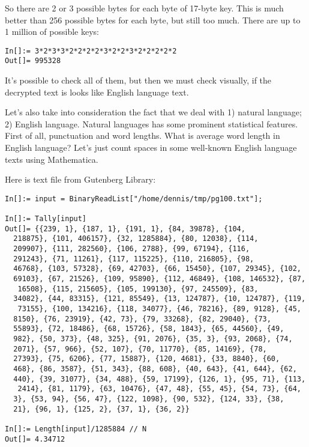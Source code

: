 So there are 2 or 3 possible bytes for each byte of 17-byte key.
This is much better than 256 possible bytes for each byte, but still too much.
There are up to 1 million of possible keys:

\begin{lstlisting}[caption=Mathematica,style=custommath]
In[]:= 3*2*3*3*2*2*2*2*3*2*2*3*2*2*2*2*2
Out[]= 995328
\end{lstlisting}

It's possible to check all of them, but then we must check visually, if the decrypted text is looks like English language text.

Let's also take into consideration the fact that we deal with 1) natural language; 2) English language.
Natural languages has some prominent statistical features.
First of all, punctuation and word lengths.
What is average word length in English language?
Let's just count spaces in some well-known English language texts using Mathematica.

Here is \href{http://www.gutenberg.org/cache/epub/100/pg100.txt}{} text file from Gutenberg Library:

\begin{lstlisting}[caption=Mathematica,style=custommath]
In[]:= input = BinaryReadList["/home/dennis/tmp/pg100.txt"];

In[]:= Tally[input]
Out[]= {{239, 1}, {187, 1}, {191, 1}, {84, 39878}, {104, 
  218875}, {101, 406157}, {32, 1285884}, {80, 12038}, {114, 
  209907}, {111, 282560}, {106, 2788}, {99, 67194}, {116, 
  291243}, {71, 11261}, {117, 115225}, {110, 216805}, {98, 
  46768}, {103, 57328}, {69, 42703}, {66, 15450}, {107, 29345}, {102, 
  69103}, {67, 21526}, {109, 95890}, {112, 46849}, {108, 146532}, {87,
   16508}, {115, 215605}, {105, 199130}, {97, 245509}, {83, 
  34082}, {44, 83315}, {121, 85549}, {13, 124787}, {10, 124787}, {119,
   73155}, {100, 134216}, {118, 34077}, {46, 78216}, {89, 9128}, {45, 
  8150}, {76, 23919}, {42, 73}, {79, 33268}, {82, 29040}, {73, 
  55893}, {72, 18486}, {68, 15726}, {58, 1843}, {65, 44560}, {49, 
  982}, {50, 373}, {48, 325}, {91, 2076}, {35, 3}, {93, 2068}, {74, 
  2071}, {57, 966}, {52, 107}, {70, 11770}, {85, 14169}, {78, 
  27393}, {75, 6206}, {77, 15887}, {120, 4681}, {33, 8840}, {60, 
  468}, {86, 3587}, {51, 343}, {88, 608}, {40, 643}, {41, 644}, {62, 
  440}, {39, 31077}, {34, 488}, {59, 17199}, {126, 1}, {95, 71}, {113,
   2414}, {81, 1179}, {63, 10476}, {47, 48}, {55, 45}, {54, 73}, {64, 
  3}, {53, 94}, {56, 47}, {122, 1098}, {90, 532}, {124, 33}, {38, 
  21}, {96, 1}, {125, 2}, {37, 1}, {36, 2}}

In[]:= Length[input]/1285884 // N
Out[]= 4.34712
\end{lstlisting}

